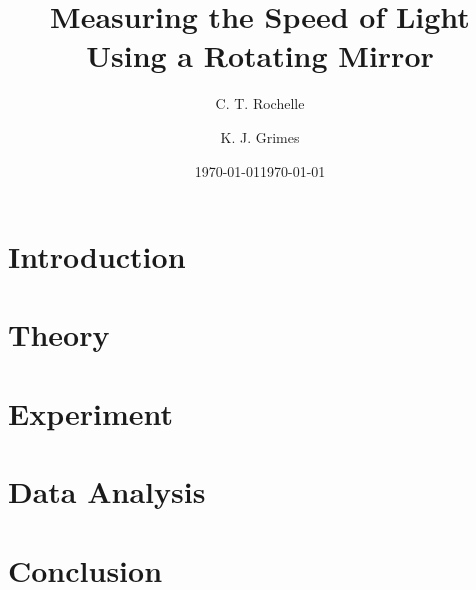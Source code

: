\documentclass[aps,prl,10pt,twocolumn,floatfix]{revtex4-2}
\begin{document}
\begin{abstract}

\end{abstract}


\title{Measuring the Speed of Light Using a Rotating Mirror}
\author{C. T. Rochelle}
\author{K. J. Grimes}
\date{\today}
\date{\today}

\maketitle

\section{Introduction}\label{Intro}
 

\section{Theory}\label{Theory}


\section{Experiment}


\section{Data Analysis}


\section{Conclusion}

\begin{thebibliography}{9}

\end{thebibliography}
\end{document}
